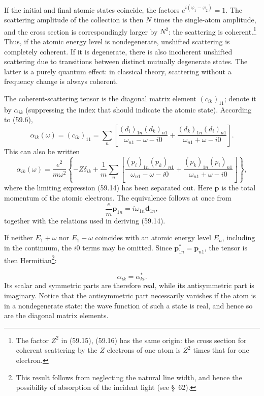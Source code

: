 If the initial and final atomic states coincide, the factors $e^{i(\varphi_1-\varphi_2)}=1$. The scattering amplitude of the collection is then $N$ times the single-atom amplitude, and the cross section is correspondingly larger by $N^2$: the scattering is coherent.\footnote{The factor $Z^2$ in (59.15), (59.16) has the same origin: the cross section for coherent scattering by the $Z$ electrons of one atom is $Z^2$ times that for one electron.} Thus, if the atomic energy level is nondegenerate, unshifted scattering is completely coherent. If it is degenerate, there is also incoherent unshifted scattering due to transitions between distinct mutually degenerate states. The latter is a purely quantum effect: in classical theory, scattering without a frequency change is always coherent.

The coherent-scattering tensor is the diagonal matrix element $(c_{ik})_{11}$; denote it by $\alpha_{ik}$ (suppressing the index that should indicate the atomic state). According to (59.6),
\begin{equation}
\alpha_{ik}(\omega)=(c_{ik})_{11}=\sum_n\left[
\frac{(d_i)_{1n}(d_k)_{n1}}{\omega_{n1}-\omega-i0}
+\frac{(d_k)_{1n}(d_i)_{n1}}{\omega_{n1}+\omega-i0}\right].
\tag{59.17}
\end{equation}
This can also be written
\begin{equation}
\alpha_{ik}(\omega)=\frac{e^2}{m\omega^2}\left\{-Z\delta_{ik}+\frac1m\sum_n\left[
\frac{(p_i)_{1n}(p_k)_{n1}}{\omega_{n1}-\omega-i0}
+\frac{(p_k)_{1n}(p_i)_{n1}}{\omega_{n1}+\omega-i0}\right]\right\},
\tag{59.18}
\end{equation}
where the limiting expression (59.14) has been separated out. Here $\mathbf p$ is the total momentum of the atomic electrons. The equivalence follows at once from
\[
\frac e m\mathbf p_{1n}=i\omega_{1n}\mathbf d_{1n},
\]
together with the relations used in deriving (59.14).

If neither $E_1+\omega$ nor $E_1-\omega$ coincides with an atomic energy level $E_n$, including in the continuum, the $i0$ terms may be omitted. Since $\mathbf p_{1n}^*=\mathbf p_{n1}$, the tensor is then Hermitian\footnote{This result follows from neglecting the natural line width, and hence the possibility of absorption of the incident light (see \S~62).}:

\begin{equation}
\alpha_{ik}=\alpha_{ki}^*.
\tag{59.19}
\end{equation}
Its scalar and symmetric parts are therefore real, while its antisymmetric part is imaginary. Notice that the antisymmetric part necessarily vanishes if the atom is in a nondegenerate state: the wave function of such a state is real, and hence so are the diagonal matrix elements.

